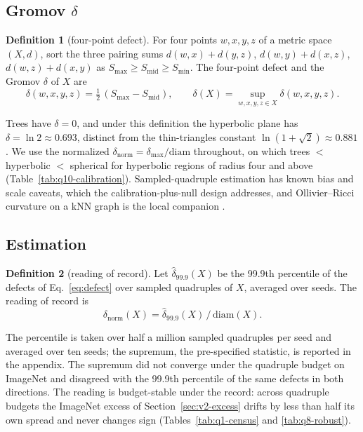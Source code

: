 \documentclass{article}
\theoremstyle{definition}
\newtheorem{definition}{Definition}
\begin{document}
\subsection{Gromov $\delta$}
\label{sec:v2-gromov}

\begin{shaded}
\begin{definition}[four-point defect]
\label{def:defect}
For four points $w,x,y,z$ of a metric space $(X,d)$, sort the three pairing sums $d(w,x){+}d(y,z)$, $d(w,y){+}d(x,z)$, $d(w,z){+}d(x,y)$ as $S_{\max}\ge S_{\mathrm{mid}}\ge S_{\min}$. The four-point defect and the Gromov $\delta$ of $X$ are
\begin{equation}
\delta(w,x,y,z)=\tfrac12\,(S_{\max}-S_{\mathrm{mid}}), \qquad \delta(X)=\sup_{w,x,y,z\in X}\delta(w,x,y,z).
\label{eq:defect}
\end{equation}
\end{definition}
\end{shaded}
Trees have $\delta=0$, and under this definition the hyperbolic plane has $\delta=\ln 2\approx0.693$, distinct from the thin-triangles constant $\ln(1+\sqrt2)\approx0.881$ \citep{nica2016strong}. We use the normalized $\delta_{\text{norm}}=\delta_{\max}/\mathrm{diam}$ throughout, on which trees $<$ hyperbolic $<$ spherical for hyperbolic regions of radius four and above (Table~\ref{tab:q10-calibration}). Sampled-quadruple estimation has known bias and scale caveats, which the calibration-plus-null design addresses, and Ollivier--Ricci curvature on a kNN graph is the local companion \citep{fournier2015computing, ollivier2009ricci}.

\subsection{Estimation}
\label{sec:v2-estimation}

\begin{shaded}
\begin{definition}[reading of record]
\label{def:record}
Let $\hat\delta_{99.9}(X)$ be the 99.9th percentile of the defects of Eq.~\ref{eq:defect} over sampled quadruples of $X$, averaged over seeds. The reading of record is
\begin{equation}
\delta_{\text{norm}}(X)=\hat\delta_{99.9}(X)\,/\,\mathrm{diam}(X).
\label{eq:record}
\end{equation}
\end{definition}
\end{shaded}
The percentile is taken over half a million sampled quadruples per seed and averaged over ten seeds; the supremum, the pre-specified statistic, is reported in the appendix. The supremum did not converge under the quadruple budget on ImageNet and disagreed with the 99.9th percentile of the same defects in both directions. The reading is budget-stable under the record: across quadruple budgets the ImageNet excess of Section~\ref{sec:v2-excess} drifts by less than half its own spread and never changes sign (Tables~\ref{tab:q1-census} and \ref{tab:q8-robust}). %
\end{document}

